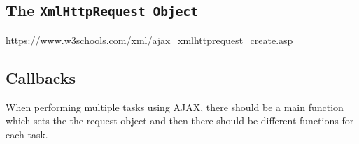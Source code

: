 	\subsection{The \texttt{XmlHttpRequest Object}}

		\url{https://www.w3schools.com/xml/ajax_xmlhttprequest_create.asp}


	\subsection{Callbacks}

		\par{When performing multiple tasks using AJAX, there should be a main function which sets the the request object and then there should be different  functions for each task.}


		




